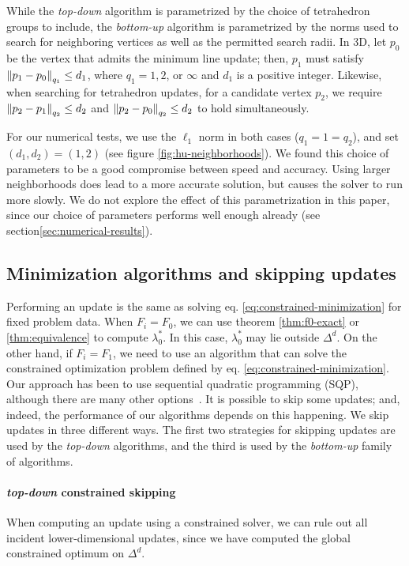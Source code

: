 \documentclass[smallcondensed]{svjour3}
\begin{document}
While the \emph{top-down} algorithm is parametrized by the choice of
tetrahedron groups to include, the \emph{bottom-up} algorithm is parametrized
by the norms used to search for neighboring vertices as well as the
permitted search radii. In 3D, let $p_0$ be the vertex that admits the
minimum line update; then, $p_1$ must satisfy
$\left\|p_1 - p_0\right\|_{q_1} \leq d_1$, where $q_1 = 1, 2$, or $\infty$ and
$d_1$ is a positive integer. Likewise, when searching for tetrahedron
updates, for a candidate vertex $p_2$, we require
$\left\|p_2 - p_1\right\|_{q_2} \leq d_2$ and
$\left\|p_2 - p_0\right\|_{q_2} \leq d_2$ to hold simultaneously.

For our numerical tests, we use the $\ell_1$ norm in both cases
($q_1 = 1 = q_2$), and set $(d_1, d_2) = (1, 2)$ (see figure
\ref{fig:hu-neighborhoods}). We found this choice of parameters to be
a good compromise between speed and accuracy. Using larger
neighborhoods does lead to a more accurate solution, but causes the
solver to run more slowly. We do not explore the effect of this
parametrization in this paper, since our choice of parameters performs
well enough already (see section\@ \ref{sec:numerical-results}).
\subsection{Minimization algorithms and skipping
  updates}\label{ssec:algorithms-and-skipping}

Performing an update is the same as solving eq.\@
\ref{eq:constrained-minimization} for fixed problem data. When
$F_i = F_0$, we can use theorem \ref{thm:f0-exact} or
\ref{thm:equivalence} to compute $\lambda_0^*$. In this case,
$\lambda_0^*$ may lie outside $\Delta^d$. On the other hand, if
$F_i = F_1$, we need to use an algorithm that can solve the
constrained optimization problem defined by eq.\@
\ref{eq:constrained-minimization}. Our approach has been to use
sequential quadratic programming (SQP), although there are many other
options~\cite{bertsekas1999nonlinear,nocedal2006numerical}. It is
possible to skip some updates; and, indeed, the performance of our
algorithms depends on this happening. We skip updates in three
different ways. The first two strategies for skipping updates are used
by the \emph{top-down} algorithms, and the third is used by the \emph{bottom-up}
family of algorithms.

\paragraph{\emph{top-down} constrained skipping} When computing an update
using a constrained solver, we can rule out all incident
lower-dimensional updates, since we have computed the global
constrained optimum on $\Delta^d$.
\end{document}

